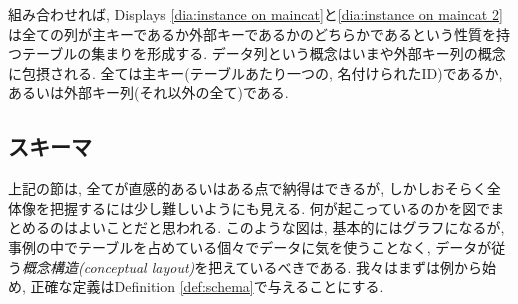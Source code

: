 \begin{example}

組み合わせれば, Displays \eqref{dia:instance on maincat}と\eqref{dia:instance on maincat 2}は全ての列が主キーであるか外部キーであるかのどちらかであるという性質を持つテーブルの集まりを形成する. データ列という概念はいまや外部キー列の概念に包摂される. 全ては主キー(テーブルあたり一つの, 名付けられたID)であるか, あるいは外部キー列(それ以外の全て)である.

\end{example}


\subsection{スキーマ}\label{sec:schemas}


上記の節は, 全てが直感的あるいはある点で納得はできるが, しかしおそらく全体像を把握するには少し難しいようにも見える. 何が起こっているのかを図でまとめるのはよいことだと思われる. このような図は, 基本的にはグラフになるが, 事例の中でテーブルを占めている個々でデータに気を使うことなく, データが従う\emph{概念構造(conceptual layout)}を把えているべきである. 我々はまずは例から始め, 正確な定義はDefinition \ref{def:schema}で与えることにする. 

